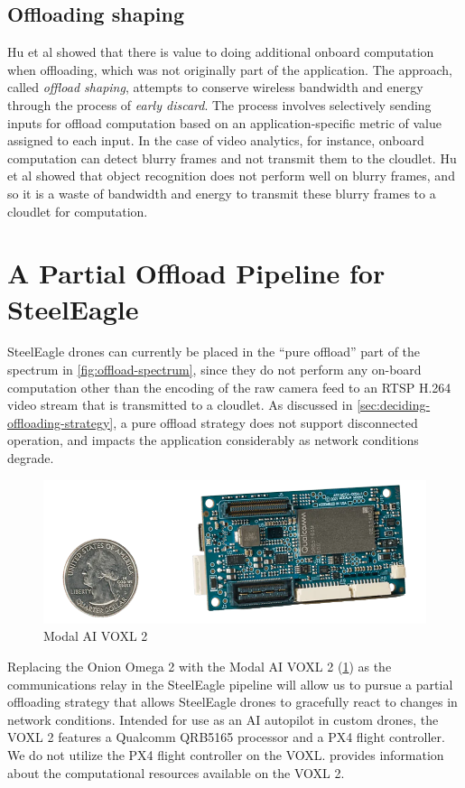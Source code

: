 \subsection{Offloading shaping}
\label{sec:offload-shaping}

Hu et al \cite{hu2015} showed that there is value to doing additional onboard
computation when offloading, which was not originally part of the application.
The approach, called \textit{offload shaping}, attempts to conserve wireless
bandwidth and energy through the process of \textit{early discard}. The process
involves selectively sending inputs for offload computation based on an
application-specific metric of value assigned to each input.  In the case of
video analytics, for instance, onboard computation can detect blurry frames and
not transmit them to the cloudlet. Hu et al showed that object recognition does
not perform well on blurry frames, and so it is a waste of bandwidth and energy
to transmit these blurry frames to a cloudlet for computation.

\section{A Partial Offload Pipeline for SteelEagle}

SteelEagle drones can currently be placed in the ``pure offload'' part of the
spectrum in \cref{fig:offload-spectrum}, since they do not perform any on-board
computation other than the encoding of the raw camera feed to an RTSP H.264
video stream that is transmitted to a cloudlet. As discussed in
\cref{sec:deciding-offloading-strategy}, a pure offload strategy does not
support disconnected operation, and impacts the application considerably as
network conditions degrade.

\begin{figure}[htbp]
\centerline{\includegraphics[width = .5\textwidth]{figs/voxl2.png}}
\caption{Modal AI VOXL 2}
\label{fig:voxl2}
\end{figure}

Replacing the Onion Omega 2 with the Modal AI VOXL 2 (\cref{fig:voxl2}) as the
communications relay in the SteelEagle pipeline will allow us to pursue a
partial offloading strategy that allows SteelEagle drones to gracefully react
to changes in network conditions. Intended for use as an AI autopilot in custom
drones, the VOXL 2 features a Qualcomm QRB5165 processor and a PX4 flight
controller. We do not utilize the PX4 flight controller on the VOXL.
 provides information about the computational resources
available on the VOXL 2.

